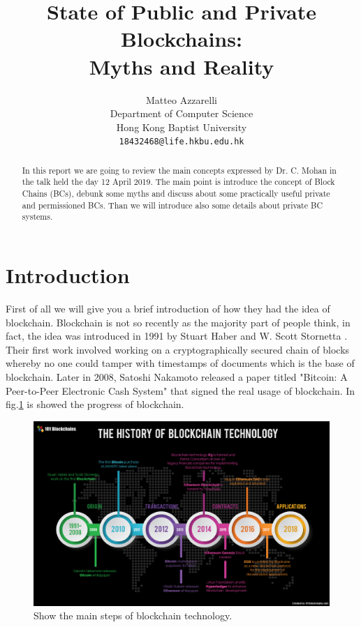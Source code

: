 \documentclass{article}
\title{State of Public and Private Blockchains:\\Myths and Reality}
\author{
  Matteo Azzarelli\\
  Department of Computer Science\\
  Hong Kong Baptist University\\
  \texttt{18432468@life.hkbu.edu.hk} \\
}
\begin{document}
\maketitle

\begin{abstract}
    In this report we are going to review the main concepts expressed by Dr. C. Mohan in the talk held the day 12 April 2019.
    The main point is introduce the concept of Block Chains (BCs), debunk some myths and discuss about some practically useful private and permissioned BCs.
    Than we will introduce also some details about private BC systems.
\end{abstract}




\section{Introduction}
    First of all we will give you a brief introduction of how they had the idea of blockchain. \cite{wiki-Blockchain} Blockchain is not so recently as the majority part of people think, in fact, the idea was introduced in 1991 by Stuart Haber and W. Scott Stornetta \cite{haber1990time,HistoryBCT}. Their first work involved working on a cryptographically secured chain of blocks whereby no one could tamper with timestamps of documents which is the base of blockchain. Later in 2008, Satoshi Nakamoto released a paper titled "Bitcoin: A Peer-to-Peer Electronic Cash System" \cite{nakamoto2008bitcoin} that signed the real usage of blockchain.
    In fig.\ref{fig:historyOfBlockchain} is showed the progress of blockchain.
    
    \begin{figure}[h]
        \centering
        \includegraphics[width=\linewidth]{History_of_Blockchain_Technology.png}
        \caption{Show the main steps of blockchain technology. \cite{HistoryBCT}}
        \label{fig:historyOfBlockchain}
    \end{figure}
    
\end{document}
